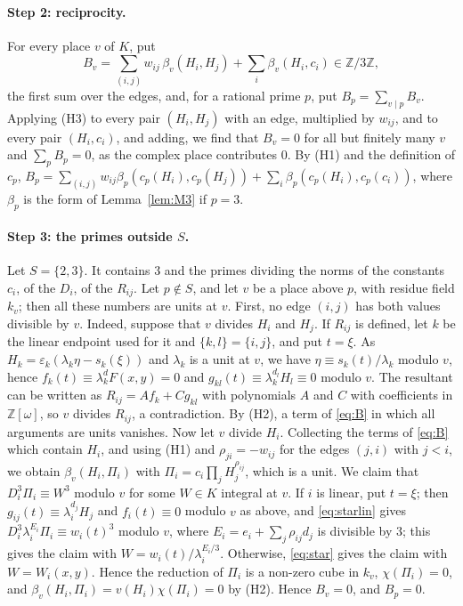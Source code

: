 \documentclass[11pt]{article}
\newcommand{\Z}{\mathbb{Z}}
\begin{document}
\paragraph{Step 2: reciprocity.} For every place $v$ of $K$, put
\begin{equation}\label{eq:B}
B_v=\sum_{(i,j)}w_{ij}\,\beta_v(H_i,H_j)+\sum_i\beta_v(H_i,c_i)\in\Z/3\Z,
\end{equation}
the first sum over the edges, and, for a rational prime $p$, put $B_p=\sum_{v\mid p}B_v$. Applying (H3) to every pair $(H_i,H_j)$ with an edge, multiplied by $w_{ij}$, and to every pair $(H_i,c_i)$, and adding, we find that $B_v=0$ for all but finitely many $v$ and $\sum_pB_p=0$, as the complex place contributes $0$. By (H1) and the definition of $c_p$, $B_p=\sum_{(i,j)}w_{ij}\beta_p(c_p(H_i),c_p(H_j))+\sum_i\beta_p(c_p(H_i),c_p(c_i))$, where $\beta_p$ is the form of Lemma~\ref{lem:M3} if $p=3$.

\paragraph{Step 3: the primes outside $S$.} Let $S=\{2,3\}$. It contains $3$ and the primes dividing the norms of the constants $c_i$, of the $D_i$, of the $R_{ij}$. Let $p\notin S$, and let $v$ be a place above $p$, with residue field $k_v$; then all these numbers are units at $v$. First, no edge $(i,j)$ has both values divisible by $v$. Indeed, suppose that $v$ divides $H_i$ and $H_j$. If $R_{ij}$ is defined, let $k$ be the linear endpoint used for it and $\{k,l\}=\{i,j\}$, and put $t=\xi$. As $H_k=\varepsilon_k(\lambda_k\eta-s_k(\xi))$ and $\lambda_k$ is a unit at $v$, we have $\eta\equiv s_k(t)/\lambda_k$ modulo $v$, hence $f_k(t)\equiv\lambda_k^dF(x,y)=0$ and $g_{kl}(t)\equiv\lambda_k^{d_l}H_l\equiv0$ modulo $v$. The resultant can be written as $R_{ij}=Af_k+Cg_{kl}$ with polynomials $A$ and $C$ with coefficients in $\Z[\omega]$, so $v$ divides $R_{ij}$, a contradiction. By (H2), a term of \eqref{eq:B} in which all arguments are units vanishes. Now let $v$ divide $H_i$. Collecting the terms of \eqref{eq:B} which contain $H_i$, and using (H1) and $\rho_{ji}=-w_{ij}$ for the edges $(j,i)$ with $j<i$, we obtain $\beta_v(H_i,\Pi_i)$ with $\Pi_i=c_i\prod_jH_j^{\rho_{ij}}$, which is a unit. We claim that $D_i^3\Pi_i\equiv W^3$ modulo $v$ for some $W\in K$ integral at $v$. If $i$ is linear, put $t=\xi$; then $g_{ij}(t)\equiv\lambda_i^{d_j}H_j$ and $f_i(t)\equiv0$ modulo $v$ as above, and \eqref{eq:starlin} gives $D_i^3\lambda_i^{E_i}\Pi_i\equiv w_i(t)^3$ modulo $v$, where $E_i=e_i+\sum_j\rho_{ij}d_j$ is divisible by $3$; this gives the claim with $W=w_i(t)/\lambda_i^{E_i/3}$. Otherwise, \eqref{eq:star} gives the claim with $W=W_i(x,y)$. Hence the reduction of $\Pi_i$ is a non-zero cube in $k_v$, $\chi(\Pi_i)=0$, and $\beta_v(H_i,\Pi_i)=v(H_i)\chi(\Pi_i)=0$ by (H2). Hence $B_v=0$, and $B_p=0$.
\end{document}
